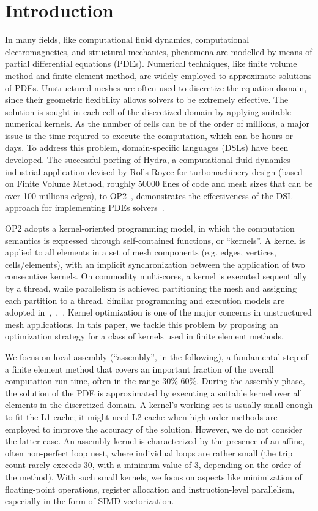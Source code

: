 \documentclass[conference]{IEEEtran}
\begin{document}
\section{Introduction}
In many fields, like computational fluid dynamics, computational electromagnetics, and structural mechanics, phenomena are modelled by means of partial differential equations (PDEs). Numerical techniques, like finite volume method and finite element method, are widely-employed to approximate solutions of PDEs. Unstructured meshes are often used to discretize the equation domain, since their geometric flexibility allows solvers to be extremely effective. The solution is sought in each cell of the discretized domain by applying suitable numerical kernels. As the number of cells can be of the order of millions, a major issue is the time required to execute the computation, which can be hours or days. To address this problem, domain-specific languages (DSLs) have been developed. The successful porting of Hydra, a computational fluid dynamics industrial application devised by Rolls Royce for turbomachinery design (based on Finite Volume Method, roughly 50000 lines of code and mesh sizes that can be over 100 millions edges), to OP2~\cite{pyop2isc}, demonstrates the effectiveness of the DSL approach for implementing PDEs solvers~\cite{OP2-hydra}. 

OP2 adopts a kernel-oriented programming model, in which the computation semantics is expressed through self-contained functions, or ``kernels''. A kernel is applied to all elements in a set of mesh components (e.g. edges, vertices, cells/elements), with an implicit synchronization between the application of two consecutive kernels. On commodity multi-cores, a kernel is executed sequentially by a thread, while parallelism is achieved partitioning the mesh and assigning each partition to a thread. Similar programming and execution models are adopted in~\cite{Fenics},~\cite{fluidity_manual_v4},~\cite{lizst}. Kernel optimization is one of the major concerns in unstructured mesh applications. In this paper, we tackle this problem by proposing an optimization strategy for a class of kernels used in finite element methods.

We focus on local assembly (``assembly'', in the following), a fundamental step of a finite element method that covers an important fraction of the overall computation run-time, often in the range 30$\%$-60$\%$. During the assembly phase, the solution of the PDE is approximated by executing a suitable kernel over all elements in the discretized domain. A kernel's working set is usually small enough to fit the L1 cache; it might need L2 cache when high-order methods are employed to improve the accuracy of the solution. However, we do not consider the latter case. An assembly kernel is characterized by the presence of an affine, often non-perfect loop nest, where individual loops are rather small (the trip count rarely exceeds 30, with a minimum value of 3, depending on the order of the method). With such small kernels, we focus on aspects like minimization of floating-point operations, register allocation and instruction-level parallelism, especially in the form of SIMD vectorization. 
\end{document}
